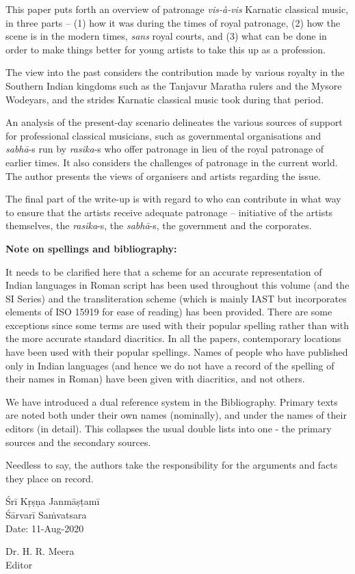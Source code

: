 This paper puts forth an overview of patronage \textit{vis-à-vis} Karnatic classical music, in three parts – (1) how it was during the times of royal patronage, (2) how the scene is in the modern times, \textit{sans} royal courts, and (3) what can be done in order to make things better for young artists to take this up as a profession.

The view into the past considers the contribution made by various royalty in the Southern Indian kingdoms such as the Tanjavur Maratha rulers and the Mysore Wodeyars, and the strides Karnatic classical music took during that period.

An analysis of the present-day scenario delineates the various sources of support for professional classical musicians, such as governmental organisations and \textit{sabhā}-s run by \textit{rasika}-s who offer patronage in lieu of the royal patronage of earlier times. It also considers the challenges of patronage in the current world. The author presents the views of organisers and artists regarding the issue.

The final part of the write-up is with regard to who can contribute in what way to ensure that the artists receive adequate patronage – initiative of the artists themselves, the \textit{rasika}-s, the \textit{sabhā}-s, the government and the corporates.

\delimiter

\textbf{Note on spellings and bibliography: }

It needs to be clarified here that a scheme for an accurate representation of Indian languages in Roman script has been used throughout this volume (and the SI Series) and the transliteration scheme (which is mainly IAST but incorporates elements of ISO 15919 for ease of reading) has been provided. There are some exceptions since some terms are used with their popular spelling rather than with the more accurate standard diacritics. In all the papers, contemporary locations have been used with their popular spellings. Names of people who have published only in Indian languages (and hence we do not have a record of the spelling of their names in Roman) have been given with diacritics, and not others.

We have introduced a dual reference system in the Bibliography. Primary texts are noted both under their own names (nominally), and under the names of their editors (in detail). This collapses the usual double lists into one - the primary sources and the secondary sources.

Needless to say, the authors take the responsibility for the arguments and facts they place on record.

\vspace{.2cm}

Śrī Kṛṣṇa Janmāṣṭamī\\ Śārvarī Saṁvatsara\\ Date: 11-Aug-2020

\vspace{-1.8cm}

\begin{flushright}
Dr. H. R. Meera\\ Editor
\end{flushright}

\theendnotes

